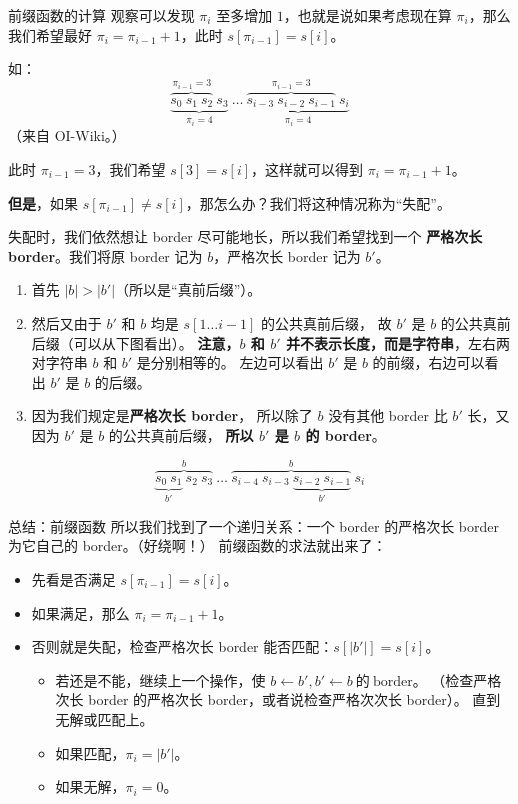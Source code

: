 \documentclass[table]{beamer}
\begin{document}
\begin{frame}{前缀函数的计算}
	观察可以发现 $\pi_i$ 至多增加 $1$，也就是说如果考虑现在算 $\pi_i$，那么我们希望最好 $\pi_i=\pi_{i-1}+1$，此时 $s[\pi_{i-1}]=s[i]$。
	\pause
	
	如：
	$$\underbrace{\overbrace{s_0 ~ s_1 ~ s_2}^{\pi_{i-1} = 3} ~ s_3}_{\pi_i = 4} ~ \dots ~ \underbrace{\overbrace{s_{i-3} ~ s_{i-2} ~ s_{i-1}}^{\pi_{i-1}=3} ~ s_{i}}_{\pi_i = 4}$$
	（来自 OI-Wiki。）

	此时 $\pi_{i-1}=3$，我们希望 $s[3]=s[i]$，这样就可以得到 $\pi_i=\pi_{i-1}+1$。
\end{frame}

\begin{frame}
	\textbf{但是}，如果 $s[\pi_{i-1}]\ne s[i]$，那怎么办？我们将这种情况称为“失配”。
	\pause

	失配时，我们依然想让 border 尽可能地长，所以我们希望找到一个
	\textbf{严格次长 border}。我们将原 border 记为 $b$，严格次长 border 记为 $b'$。
	\pause

	\begin{enumerate}
		\item 首先 $|b|>|b'|$（所以是“真前后缀”）。
		\pause
		\item 然后又由于 $b'$ 和 $b$ 均是 $s[1\dots i-1]$ 的公共真前后缀，
		故 $b'$ 是 $b$ 的公共真前后缀（可以从下图看出）。
		\textbf{注意，$b$ 和 $b'$ 并不表示长度，而是字符串}，左右两对字符串 $b$ 和 $b'$ 是分别相等的。
		左边可以看出 $b'$ 是 $b$ 的前缀，右边可以看出 $b'$ 是 $b$ 的后缀。
		\pause
		\item 因为我们规定是\textbf{严格次长 border}，
		所以除了 $b$ 没有其他 border 比 $b'$ 长，又因为 $b'$ 是 $b$ 的公共真前后缀，
		\textbf{所以 $b'$ 是 $b$ 的 border}。
	\end{enumerate}
$$\overbrace{\underbrace{s_0 ~ s_1}_{b'} ~ s_2 ~ s_3}^{b} ~ \dots ~ \overbrace{s_{i-4} ~ s_{i-3} ~ \underbrace{s_{i-2} ~ s_{i-1}}_{b'}}^{b} ~ s_{i}$$
\end{frame}

\begin{frame}{总结：前缀函数}
	所以我们找到了一个递归关系：一个 border 的严格次长 border 为它自己的 border。（好绕啊！）
	前缀函数的求法就出来了：
	\begin{itemize}
		\item 先看是否满足 $s[\pi_{i-1}]=s[i]$。
		\item 如果满足，那么 $\pi_i=\pi_{i-1}+1$。
		\item 否则就是失配，检查严格次长 border 能否匹配：$s[|b'|]=s[i]$。
		\begin{itemize}
			\item 若还是不能，继续上一个操作，使 $b\gets b',b'\gets b~的~\text{border}$。
			（检查严格次长 border 的严格次长 border，或者说检查严格次次长 border）。
			直到无解或匹配上。
			\item 如果匹配，$\pi_{i}=|b'|$。
			\item 如果无解，$\pi_{i}=0$。
		\end{itemize}
	\end{itemize}
\end{frame}
\end{document}

